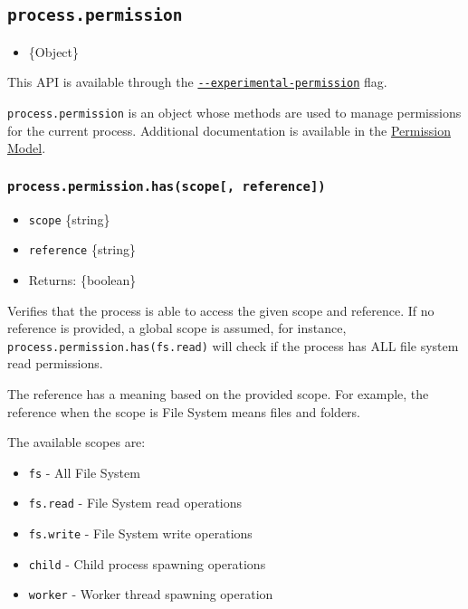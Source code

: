 \subsection{\texorpdfstring{\texttt{process.permission}}{process.permission}}\label{process.permission}

\begin{itemize}
\tightlist
\item
  \{Object\}
\end{itemize}

This API is available through the
\href{cli.md\#--experimental-permission}{\texttt{-\/-experimental-permission}}
flag.

\texttt{process.permission} is an object whose methods are used to
manage permissions for the current process. Additional documentation is
available in the \href{permissions.md\#permission-model}{Permission
Model}.

\subsubsection{\texorpdfstring{\texttt{process.permission.has(scope{[},\ reference{]})}}{process.permission.has(scope{[}, reference{]})}}\label{process.permission.hasscope-reference}

\begin{itemize}
\tightlist
\item
  \texttt{scope} \{string\}
\item
  \texttt{reference} \{string\}
\item
  Returns: \{boolean\}
\end{itemize}

Verifies that the process is able to access the given scope and
reference. If no reference is provided, a global scope is assumed, for
instance,
\texttt{process.permission.has(\textquotesingle{}fs.read\textquotesingle{})}
will check if the process has ALL file system read permissions.

The reference has a meaning based on the provided scope. For example,
the reference when the scope is File System means files and folders.

The available scopes are:

\begin{itemize}
\tightlist
\item
  \texttt{fs} - All File System
\item
  \texttt{fs.read} - File System read operations
\item
  \texttt{fs.write} - File System write operations
\item
  \texttt{child} - Child process spawning operations
\item
  \texttt{worker} - Worker thread spawning operation
\end{itemize}

